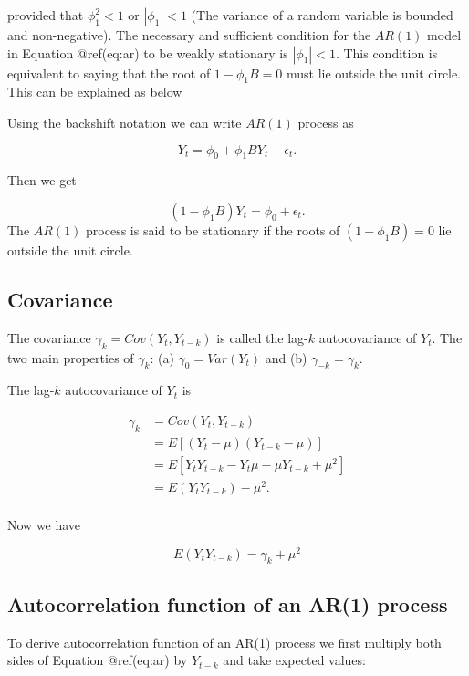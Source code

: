 \documentclass[
  11pt,
  a4paper,
]{report}
\begin{document}
provided that \(\phi_1^2 < 1\) or \(|\phi_1| < 1\) (The variance of a
random variable is bounded and non-negative). The necessary and
sufficient condition for the \(AR(1)\) model in Equation @ref(eq:ar) to
be weakly stationary is \(|\phi_1| < 1\). This condition is equivalent
to saying that the root of \(1-\phi_1B = 0\) must lie outside the unit
circle. This can be explained as below

Using the backshift notation we can write \(AR(1)\) process as

\[Y_t = \phi_0 + \phi_1BY_{t} + \epsilon_t.\]

Then we get

\[(1-\phi_1B)Y_t=\phi_0 + \epsilon_t.\] The \(AR(1)\) process is said to
be stationary if the roots of \((1-\phi_1B)=0\) lie outside the unit
circle.

\subsection{Covariance}\label{covariance}

The covariance \(\gamma_k=Cov(Y_t, Y_{t-k})\) is called the lag-\(k\)
autocovariance of \(Y_t\). The two main properties of \(\gamma_k\): (a)
\(\gamma_0=Var(Y_t)\) and (b) \(\gamma_{-k}=\gamma_{k}\).

The lag-\(k\) autocovariance of \(Y_t\) is

\begin{equation}
\begin{aligned}
  \gamma_k &= Cov(Y_t, Y_{t-k}) \\
         &= E[(Y_t-\mu)(Y_{t-k}-\mu)] \\
         &= E[Y_tY_{t-k}-Y_t\mu-\mu Y_{t-k} +\mu^2] \\
         &= E(Y_t Y_{t-k}) - \mu^2. \\
\end{aligned}
\end{equation}

Now we have

\begin{equation}
  E(Y_t Y_{t-k}) = \gamma_k + \mu^2
\end{equation}

\subsection{Autocorrelation function of an AR(1)
process}\label{autocorrelation-function-of-an-ar1-process}

To derive autocorrelation function of an AR(1) process we first multiply
both sides of Equation @ref(eq:ar) by \(Y_{t-k}\) and take expected
values:
\end{document}
